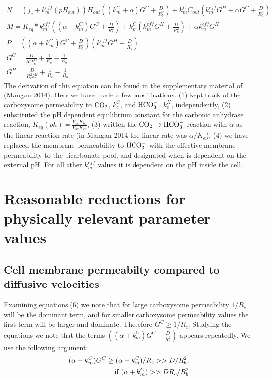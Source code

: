 \documentclass[]{article}
\begin{document}
\begin{eqnarray}
N = (j_c+k_m^{eff}(pH_{out}))H_{out}((k_m^C+\alpha)G^C+\frac{D}{R_b^2}) + k_m^C C_{out} (k_m^{eff} G^H +\alpha G^C+\frac{D}{R_b^2}) \\
M = K_{eq}*k_m^{eff}\left((\alpha+ k_m^C)G^C +  \frac{D}{R_b^2}\right)
+ k_m^C\left(k_m^{eff} G^H + \frac{D}{R_b^2}\right) + \alpha k_m^{eff} G^H \\
P = ((\alpha + k_m^C)G^C+\frac{D}{R_b^2})(k_m^{eff} G^H + \frac{D}{R_b^2}) \\
G^C = \frac{D}{R_c^2 k_c^C} + \frac{1}{R_c}-\frac{1}{R_b} \\
G^H = \frac{D}{R_c^2 k_c^H} + \frac{1}{R_c}-\frac{1}{R_b} 
\end{eqnarray}
The derivation of this equation can be found in the supplementary material of (Mangan 2014). Here we have made a few modifications: (1) kept track of the carboxysome permeability to ${\rm CO_2}$, $k_c^C$, and ${\rm HCO_3^-}$, $k_c^H$, independently, (2) substituted the pH dependent equilibrium constant for the carbonic anhydrase reaction, $K_{eq}(ph) = \frac{V_{ca} K_{ba}}{V_{ba}K_{ca}}$, (3) written the ${\rm CO_2} \rightarrow {\rm HCO_3^-}$ reaction with $\alpha$ as the linear reaction rate (in Mangan 2014 the linear rate was $\alpha/K_\alpha$), (4) we have replaced the membrane permeability to ${\rm HCO_3^-}$ with the effective membrane permeability to the bicarbonate pool, and designated when is dependent on the external pH. For all other $k_m^{eff}$ values it is dependent on the pH inside the cell.



\section{Reasonable reductions for physically relevant parameter values}
\subsection{Cell membrane permeabilty compared to diffusive velocities}
Examining equations (6) we note that for large carboxysome permeability $1/R_c$ will be the dominant term, and for smaller carboxysome permeability values the first term will be larger and dominate. Therefore $G^C \geq 1/R_c$. Studying the equations we note that the terms $((\alpha + k_m^C)G^C+\frac{D}{R_b^2})$ appears repeatedly. We use the following argument:
\begin{eqnarray}
(\alpha + k_m^C)G^C \geq (\alpha + k_m^C)/R_c>>D/R_b^2, \\
\; {\rm if} \; (\alpha +k_m^C)>> D R_c/R_b^2
\end{eqnarray}
\end{document}
